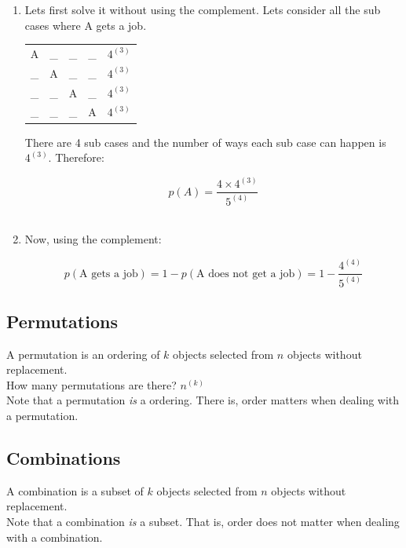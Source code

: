 \documentclass[12pt, letterpaper]{article}
\begin{document}
\begin{enumerate}
\item Lets first solve it without using the complement. Lets consider all the sub cases where A gets a job.

\begin{center}
\begin{tabular}{c c c c c}
A & \_ & \_ & \_ & \(4^{(3)}\) \\ 
\_ & A & \_ & \_ & \(4^{(3)}\) \\ 
\_ & \_ & A & \_ & \(4^{(3)}\) \\ 
\_ & \_ & \_ & A & \(4^{(3)}\) \\ 
\end{tabular}
\end{center}

There are 4 sub cases and the number of ways each sub case can happen is \(4^{(3)}\).
Therefore:

\[
	p\left(A\right) = \frac{4 \times 4^{(3)}}{5^{(4)}}
\]\\

\item Now, using the complement:

\[
p\left(\text{A gets a job}\right) = 1 - p\left(\text{A does not get a job}\right) = 1 - \frac{4^{(4)}}{5^{(4)}}
\]
\end{enumerate}

\subsection{Permutations}
A permutation is an ordering of \(k\) objects selected from \(n\) objects without replacement.\\

How many permutations are there? \(n^{(k)}\)\\

Note that a permutation \emph{is} a ordering. There is, order matters when dealing with a permutation.

\subsection{Combinations}
A combination is a subset of \(k\) objects selected from \(n\) objects without replacement.\\

Note that a combination \emph{is} a subset. That is, order does not matter when dealing with a combination. \\
\end{document}
